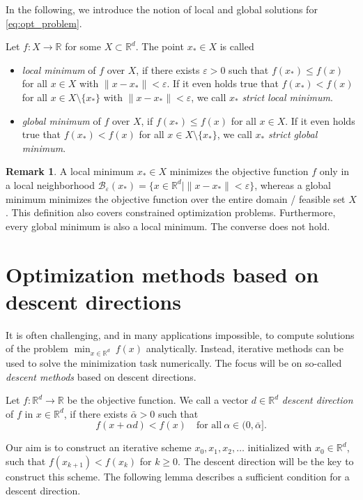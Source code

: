 \documentclass[12pt,openany]{book}
\theoremstyle{definition}
\newtheorem{remark}[thm]{Remark}
\theoremstyle{definition}
\newcommand{\R}{\mathbb{R}}
\begin{document}
In the following, we introduce the notion of local and global solutions for \eqref{eq:opt_problem}.
\begin{defi}
Let $f:X\to\R$ for some $X\subset \R^d$. The point $x_\ast\in X$ is called 
\begin{itemize}
\item[a)] \textit{local minimum} of $f$ over $X$, if there exists $\varepsilon>0$ such that $f(x_\ast)\le f(x)$ for all $x\in X$ with $\|x-x_\ast\|<\varepsilon$. If it even holds true that $f(x_\ast)<f(x)$ for all $x\in X\setminus \{x_\ast\} $ with $\|x-x_\ast\|<\varepsilon$, we call $x_\ast$ \textit{strict local minimum}.
\item[b)] \textit{global minimum} of $f$ over $X$, if $f(x_\ast)\le f(x)$ for all $x\in X$. If it even holds true that $f(x_\ast)<f(x)$ for all $x\in X\setminus \{x_\ast\}$, we call $x_\ast$ \textit{strict global minimum}.
\end{itemize}
\end{defi}
\begin{remark}
A local minimum $x_\ast\in X$ minimizes the objective function $f$ only in a local neighborhood $\mathcal B_{\varepsilon}(x_\ast) = \{x\in \R^d\mid \|x-x_\ast\|<\varepsilon\}$, whereas a global minimum minimizes the objective function over the entire domain / feasible set $X$. This definition also covers constrained optimization problems.
Furthermore, every global minimum is also a local minimum. The converse does not hold. 
\end{remark}


\section{Optimization methods based on descent directions}
It is often challenging, and in many applications impossible, to compute solutions of the problem $\min_{x\in\R^d}\ f(x)$ analytically. Instead, iterative methods can be used to solve the minimization task numerically. The focus will be on so-called \textit{descent methods} based on descent directions.

\begin{defi}\label{defi:descentdirection}
Let $f:\R^d\to\R$ be the objective function. We call a vector $d\in\R^d$ \textit{descent direction} of $f$ in $x\in\R^d$, if there exists $\bar \alpha>0$ such that
\[f(x+\alpha d) < f(x) \quad \text{for all}\ \alpha\in(0,\bar \alpha].\]
\end{defi}

Our aim is to construct an iterative scheme $x_0,x_1,x_2,\dots$ initialized with $x_0\in\R^d$, such that $f(x_{k+1})<f(x_k)$ for $k\ge0$. The descent direction will be the key to construct this scheme. The following lemma describes a sufficient condition for a descent direction.
\end{document}
